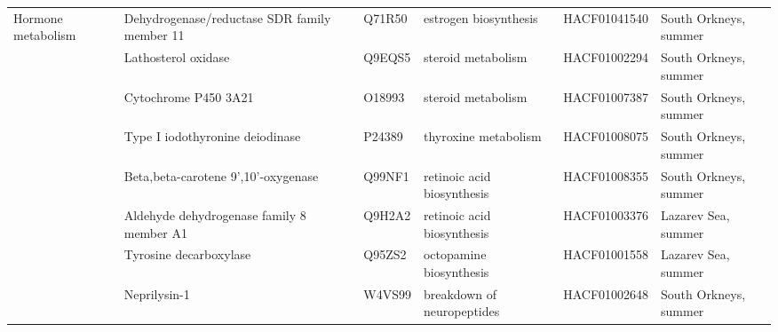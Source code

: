 {\begin{longtable}{@{}L{1.8cm}L{3cm}L{2cm}L{2.5cm}L{1.75cm}L{2.5cm}@{}}
Hormone metabolism                     & Dehydrogenase/reductase SDR family member 11                            & Q71R50                                  & estrogen biosynthesis                                                                                & HACF01041540       & South Orkneys, summer                \\
                                       & Lathosterol oxidase                                                     & Q9EQS5                                  & steroid metabolism                                                                                   & HACF01002294       & South Orkneys, summer                \\
                                       & Cytochrome P450 3A21                                                    & O18993                                  & steroid metabolism                                                                                   & HACF01007387       & South Orkneys, summer                \\
                                       & Type I iodothyronine deiodinase                                         & P24389                                  & thyroxine metabolism                                                                                 & HACF01008075       & South Orkneys, summer                \\
                                       & Beta,beta-carotene 9',10'-oxygenase                                     & Q99NF1                                  & retinoic acid biosynthesis                                                                           & HACF01008355       & South Orkneys, summer                \\
                                       & Aldehyde dehydrogenase family 8 member A1                               & Q9H2A2                                  & retinoic acid biosynthesis                                                                           & HACF01003376       & Lazarev Sea, summer                  \\
                                       & Tyrosine decarboxylase                                                  & Q95ZS2                                  & octopamine biosynthesis                                                                              & HACF01001558       & Lazarev Sea, summer                  \\
                                       & Neprilysin-1                                                            & W4VS99                                  & breakdown of neuropeptides                                                                           & HACF01002648       & South Orkneys, summer                \\

\end{longtable}}
